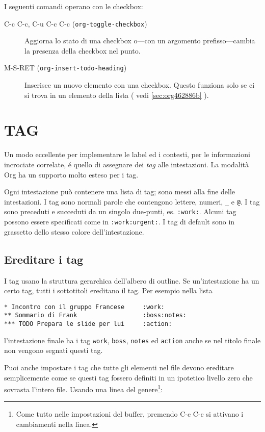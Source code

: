 \documentclass[11pt]{article}
\begin{document}
I seguenti comandi operano con le checkbox:

\begin{description}
\item[{C-c C-c, C-u C-c C-c (\texttt{org-toggle-checkbox})}] Aggiorna lo stato di una checkbox o---con un argomento
prefisso---cambia la presenza della checkbox nel punto.

\item[{M-S-RET (\texttt{org-insert-todo-heading})}] Inserisce un nuovo elemento con una checkbox. Questo funziona solo
se ci si trova in un elemento della lista ( vedi \ref{sec:org462886b} ).
\end{description}

\section{TAG}
\label{sec:org56e6514}
Un modo eccellente per implementare le label ed i contesti, per le
informazioni incrociate correlate, é quello di assegnare dei \emph{tag} alle
intestazioni. La modalità Org ha un supporto molto esteso per i tag.

Ogni intestazione può contenere una lista di tag; sono messi alla fine
delle intestazioni. I tag sono normali parole che contengono lettere,
numeri, \texttt{\_} e \texttt{@}. I tag sono preceduti e succeduti da un singolo
due-punti, es. \texttt{:work:}. Alcuni tag possono essere specificati come in
\texttt{:work:urgent:}. I tag di default sono in grassetto dello stesso
colore dell'intestazione.

\subsection*{Ereditare i tag}
\label{sec:orge04d1cb}
I tag usano la struttura gerarchica dell'albero di outline. Se
un'intestazione ha un certo tag, tutti i sottotitoli ereditano il
tag. Per esempio nella lista

\begin{verbatim}
* Incontro con il gruppo Francese     :work:
** Sommario di Frank                  :boss:notes:
*** TODO Prepara le slide per lui     :action:
\end{verbatim}

l'intestazione finale ha i tag \texttt{work}, \texttt{boss}, \texttt{notes} ed \texttt{action} anche se nel titolo finale non vengono segnati
questi tag.

Puoi anche impostare i tag che tutte gli elementi nel file devono
ereditare semplicemente come se questi tag fossero definiti in un
ipotetico livello zero che sovrasta l'intero file. Usando una linea
del genere\footnote{Come tutto nelle impostazioni del buffer, premendo C-c C-c si attivano i cambiamenti nella linea.}:
\end{document}
